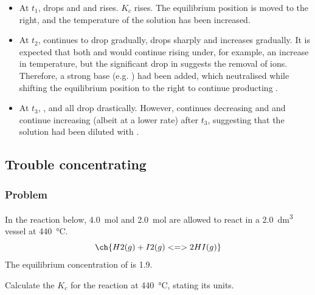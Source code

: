 \documentclass[12pt, a4paper, twoside]{pancake-book}
\begin{document}
\begin{itemize}
	\item At \(t_1\), \ch{[HOCl]} drops and \ch{[H^{+}]} and \ch{[OCl^-]} rises. \(K_c\)
	      rises. The equilibrium position is moved to the right, and {\color{accent} the
			      temperature of the solution has been increased}.
	\item At \(t_2\), \ch{[HOCl]} continues to drop gradually, \ch{[H^{+}]} drops sharply
	      and \ch{[OCl^-]} increases gradually. It is expected that both \ch{[H^{+}]} and \ch{[OCl]}
	      would continue rising under, for example, an increase in temperature, but
	      the significant drop in \ch{[H^{+}]} suggests the removal of  ions.
	      Therefore, {\color{accent} a strong base (e.g. ) had been added},
	      which neutralised  while shifting the equilibrium position to the right
	      to continue producting .
	\item At \(t_3\), \ch{[HOCl]}, \ch{[OCl^-]} and \ch{[H^{+}]} all drop drastically. However,
	      \ch{[HOCl]} continues decreasing and \ch{[H^{+}]} and \ch{[OCl^-]} continue increasing (albeit
	      at a lower rate) after \(t_3\), suggesting that {\color{accent} the solution had been
			      diluted with }.
\end{itemize}

\subsection{Trouble concentrating}
\subsubsection{Problem}

In the reaction below, \qty{4.0}{\mol}  and \qty{2.0}{\mol}  are allowed
to react in a \qty{2.0}{\dm\cubed} vessel at \qty{440}{\celsius}.
\begin{equation}
	\ch{H2 (g) + I2 (g) <=> 2 HI (g)}
\end{equation}
The equilibrium concentration of  is \qty{1.9}{\conc}.

Calculate the \(K_c\) for the reaction at
\qty{440}{\celsius}, stating its units.
\end{document}
